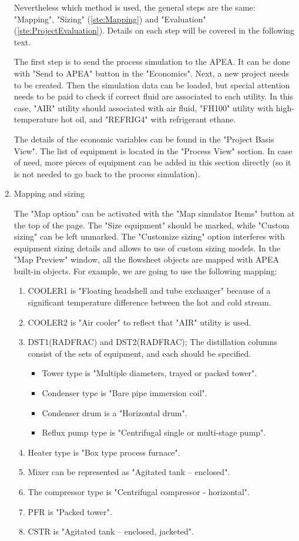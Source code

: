 \begin{enumerate}[label=\textbf{Step \arabic{enumi}}:,ref=Step \arabic{enumi}]
	Nevertheless which method is used, the general steps are the same: "Mapping", "Sizing" (\ref{ste:Mapping}) and "Evaluation" (\ref{ste:ProjectEvaluation}). Details on each step will be covered in the following text.
	
	The first step is to send the process simulation to the APEA. It can be done with "Send to APEA" button in the "Economics". Next, a new project needs to be created. Then the simulation data can be loaded, but special attention needs to be paid to check if correct fluid are associated to each utility. In this case, "AIR" utility should associated with air fluid, "FH100" utility with high-temperature hot oil, and "REFRIG4" with refrigerant	ethane.
	
	The details of the economic variables can be found in the "Project Basis View". The list of equipment is located in the "Process View" section. In case of need, more pieces of equipment can be added in this section directly (so it is not needed to go back to the process simulation).
	
	\item Mapping and sizing \label{ste:Mapping}
	
	The "Map option" can be activated with the "Map simulator Items" button at the top of the page. The "Size equipment" should be marked, while "Custom sizing" can be left unmarked. The "Customize sizing" option interferes with equipment sizing details and allows to use of custom sizing models. In the "Map Preview" window, all the flowsheet objects are mapped with APEA built-in objects. For example, we are going to use the following mapping:
	
	\begin{enumerate}
		\item COOLER1 is "Floating headshell and tube exchanger" because of a significant temperature difference between the hot and cold stream.
		\item COOLER2 is "Air cooler" to reflect that "AIR" utility is used.
		\item DST1(RADFRAC) and DST2(RADFRAC); The distillation columns consist of the sets of equipment, and each should be specified.
		\begin{itemize}
			\item Tower type is "Multiple diameters, trayed or packed tower".
			\item Condenser type is "Bare pipe immersion coil".
			\item Condenser drum is a "Horizontal drum".
			\item Reflux pump type is "Centrifugal single or multi-stage pump".
		\end{itemize}
		\item Heater type is "Box type process furnace".
		\item Mixer can be represented as "Agitated tank – enclosed".
		\item The compressor type is "Centrifugal compressor - horizontal".
		\item PFR is "Packed tower".
		\item CSTR is "Agitated tank – enclosed, jacketed".
	\end{enumerate}
	

\end{enumerate}
